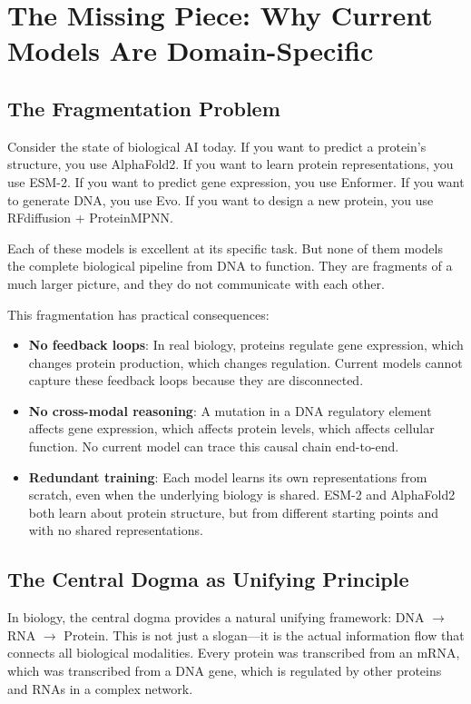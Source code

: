 \section{The Missing Piece: Why Current Models Are Domain-Specific}
\label{sec:missing-piece}

\subsection{The Fragmentation Problem}

Consider the state of biological AI today. If you want to predict a protein's structure, you use AlphaFold2. If you want to learn protein representations, you use ESM-2. If you want to predict gene expression, you use Enformer. If you want to generate DNA, you use Evo. If you want to design a new protein, you use RFdiffusion + ProteinMPNN.

Each of these models is excellent at its specific task. But none of them models the complete biological pipeline from DNA to function. They are fragments of a much larger picture, and they do not communicate with each other.

This fragmentation has practical consequences:
\begin{itemize}[leftmargin=1.5em]
  \item \textbf{No feedback loops}: In real biology, proteins regulate gene expression, which changes protein production, which changes regulation. Current models cannot capture these feedback loops because they are disconnected.
  \item \textbf{No cross-modal reasoning}: A mutation in a DNA regulatory element affects gene expression, which affects protein levels, which affects cellular function. No current model can trace this causal chain end-to-end.
  \item \textbf{Redundant training}: Each model learns its own representations from scratch, even when the underlying biology is shared. ESM-2 and AlphaFold2 both learn about protein structure, but from different starting points and with no shared representations.
\end{itemize}

\subsection{The Central Dogma as Unifying Principle}

In biology, the central dogma provides a natural unifying framework: DNA $\to$ RNA $\to$ Protein. This is not just a slogan---it is the actual information flow that connects all biological modalities. Every protein was transcribed from an mRNA, which was transcribed from a DNA gene, which is regulated by other proteins and RNAs in a complex network.

